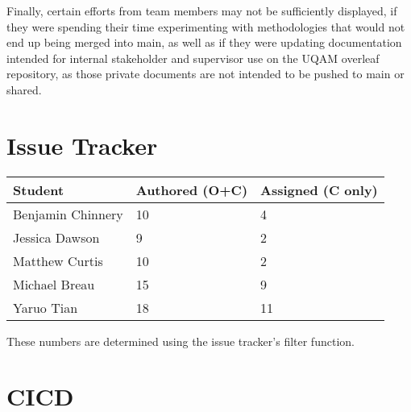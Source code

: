 \documentclass{article}
\begin{document}
Finally, certain efforts from team members may not be sufficiently displayed, if they were spending their time experimenting with methodologies that would not end up being merged into main, as well as if they were updating documentation intended for internal stakeholder and supervisor use on the UQAM overleaf repository, as those private documents are not intended to be pushed to main or shared.



\section{Issue Tracker}

\begin{table}[H]
\centering
\begin{tabular}{lll}
\toprule
\textbf{Student} & \textbf{Authored (O+C)} & \textbf{Assigned (C only)}\\
\midrule
Benjamin Chinnery & 10 & 4 \\
Jessica Dawson& 9 & 2 \\
Matthew Curtis & 10 & 2 \\
Michael Breau & 15 & 9 \\
Yaruo Tian & 18 & 11 \\
\bottomrule
\end{tabular}
\end{table}

These numbers are determined using the issue tracker's filter function.

\section{CICD}

\end{document}
